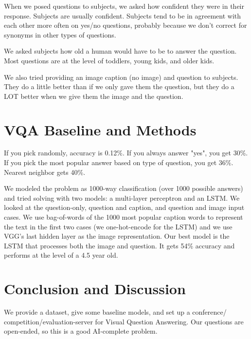 \documentclass[a4paper]{article}
\begin{document}
When we posed questions to subjects, we asked how confident they were in their
response. Subjects are usually confident. Subjects tend to be in agreement
with each other more often on yes/no questions, probably because we don't
correct for synonyms in other types of questions.

We asked subjects how old a human would have to be to answer the question.
Most questions are at the level of toddlers, young kids, and older kids.

We also tried providing an image caption (no image) and question to subjects.
They do a little better than if we only gave them the question, but they
do a LOT better when we give them the image and the question.

\section{VQA Baseline and Methods}
If you pick randomly, accuracy is 0.12\%. If you always answer "yes", you get
30\%. If you pick the most popular answer based on type of question, you get
36\%. Nearest neighbor gets 40\%.

We modeled the problem as 1000-way classification (over 1000 possible answers)
and tried solving with two models: a multi-layer perceptron and an LSTM.
We looked at the question-only, question and caption, and question and image
input cases. We use bag-of-words of the 1000 most popular caption words
to represent the text in the first two cases (we one-hot-encode for the LSTM)
and we use VGG's
last hidden layer as the image representation. Our best model is the LSTM
that processes both the image and question. It gets 54\% accuracy and performs
at the level of a 4.5 year old.

\section{Conclusion and Discussion}
We provide a dataset, give some baseline models, and set up a conference/
competition/evaluation-server for Visual Question Answering. Our questions
are open-ended, so this is a good AI-complete problem.
\end{document}
